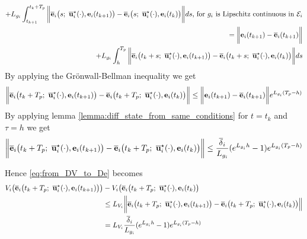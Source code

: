 \begin{gg_box}
\begin{alignat}{2}
  +  L_{g_i} \int_{t_{k+1}}^{t_k + T_p} \bigg\| \overline{\vect{e}}_i\big(s;\ \overline{\vect{u}}_i^{\star}(\cdot), \vect{e}_i(t_{k+1})\big)
  - \overline{\vect{e}}_i\big(s;\ \overline{\vect{u}}_i^{\star}(\cdot), \vect{e}_i(t_k)\big) \bigg\| ds \text{, for } g_i \text{ is Lipschitz continuous in } \mathcal{E}_i\\
  = \bigg \| \vect{e}_i(t_{k+1}) - \overline{\vect{e}}_i(t_{k+1}) \bigg\| \\
  +  L_{g_i} \int_{h}^{T_p} \bigg\| \overline{\vect{e}}_i\big(t_k + s;\ \overline{\vect{u}}_i^{\star}(\cdot), \vect{e}_i(t_{k+1})\big)
  - \overline{\vect{e}}_i\big(t_k + s;\ \overline{\vect{u}}_i^{\star}(\cdot), \vect{e}_i(t_k)\big) \bigg\| ds
\end{alignat}
By applying the  Gr\"{o}nwall-Bellman inequality we get
\begin{alignat}{2}
  \bigg \|\overline{\vect{e}}_i\big(t_k + T_p;\ \overline{\vect{u}}_i^{\star}(\cdot), \vect{e}_i(t_{k+1})\big)
    - \overline{\vect{e}}_i\big(t_k + T_p;\ \overline{\vect{u}}_i^{\star}(\cdot), \vect{e}_i(t_k)\big) \bigg\|
    \leq \bigg \| \vect{e}_i(t_{k+1}) - \overline{\vect{e}}_i(t_{k+1}) \bigg\| e^{L_{g_i} (T_p - h)}
\end{alignat}
By applying lemma \eqref{lemma:diff_state_from_same_conditions} for $t = t_k$ and
$\tau = h$ we get
\begin{alignat}{2}
  \bigg \|\overline{\vect{e}}_i\big(t_k + T_p;\ \overline{\vect{u}}_i^{\star}(\cdot), \vect{e}_i(t_{k+1})\big)
    - \overline{\vect{e}}_i\big(t_k + T_p;\ \overline{\vect{u}}_i^{\star}(\cdot), \vect{e}_i(t_k)\big) \bigg\|
    \leq \dfrac{\overline{\delta}_i}{L_{g_i}} (e^{L_{g_i}h} - 1) e^{L_{g_i} (T_p - h)}
\end{alignat}

Hence \eqref{eq:from_DV_to_De} becomes
\begin{align}
  V_i\big(\overline{\vect{e}}_i\big(t_k + T_p;\ \overline{\vect{u}}_i^{\star}(\cdot), \vect{e}_i(t_{k+1})\big)\big)
    &- V_i\big(\overline{\vect{e}}_i\big(t_k + T_p;\ \overline{\vect{u}}_i^{\star}(\cdot), \vect{e}_i(t_k)\big) \\
  &\leq L_{V_i}\bigg \| \overline{\vect{e}}_i\big(t_k + T_p;\ \overline{\vect{u}}_i^{\star}(\cdot), \vect{e}_i(t_{k+1})\big)
    - \overline{\vect{e}}_i\big(t_k + T_p;\ \overline{\vect{u}}_i^{\star}(\cdot), \vect{e}_i(t_k) \big)\Big\| \\
  &= L_{V_i} \dfrac{\overline{\delta}_i}{L_{g_i}} (e^{L_{g_i}h} - 1) e^{L_{g_i} (T_p - h)}
\label{eq:from_DV_to_eq}
\end{align}


\end{gg_box}
